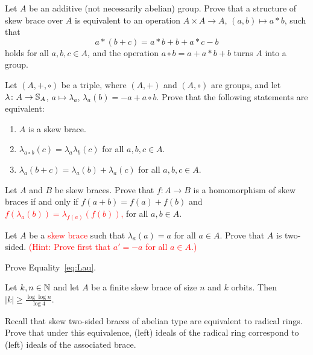 \begin{prob}
\label{prob:star}
Let $A$ be an additive (not necessarily abelian) group.  
Prove that a structure of skew brace over $A$ is equivalent to an operation $A\times A\to
A$, $(a,b)\mapsto a*b$, such that 
\[
a*(b+c)=a*b+b+a*c-b
\]
holds for all $a,b,c\in A$, and the operation $a\circ b=a+a*b+b$ turns $A$
into a group. 
\end{prob}

\begin{prob}
\label{prob:equivalences}
	Let $(A,+,\circ)$ be a triple, where 
	$(A,+)$ and $(A,\circ)$ are
	groups, and let $\lambda\colon A\to\mathbb{S}_A$, $a\mapsto\lambda_a$, $\lambda_a(b)=-a+a\circ b$. 
	Prove that the following statements are equivalent:
	\begin{enumerate}
		\item $A$ is a skew brace.
		\item $\lambda_{a\circ b}(c)=\lambda_a\lambda_b(c)$ for all $a,b,c\in A$.
		\item $\lambda_a(b+c)=\lambda_a(b)+\lambda_a(c)$ for all $a,b,c\in A$.
	\end{enumerate}
\end{prob}

\begin{prob}
Let $A$ and $B$ be skew braces. Prove that $f\colon A\rightarrow B$ is a homomorphism of skew braces if and only if $f(a+b)=f(a)+f(b)$ and \textcolor{red}{$f(\lambda_a(b))=\lambda_{f(a)}(f(b))$,} for all $a,b\in A$.
\end{prob}


\begin{prob}
\label{prob:2sided}
	Let $A$ be a \textcolor{red}{skew brace} such that $\lambda_a(a)=a$ for all $a\in A$.
	Prove that $A$ is two-sided. \textcolor{red}{(Hint: Prove first that $a'=-a$ for all $a\in A$.)}
\end{prob}

\begin{prob}
\label{prob:Lau}
    Prove Equality~\eqref{eq:Lau}.
\end{prob}

\begin{prob}
\label{prob:Landau}
Let $k,n\in\mathbb{N}$ and let $A$ be a finite skew brace of size $n$ and $k$ orbits. 
Then $|k|\geq\frac{\log\log n}{\log 4}$. 
\end{prob}


\begin{prob}
\label{prob:radical}
Recall that skew two-sided braces of abelian type are equivalent to radical rings. Prove that under this equivalence, 
(left) ideals of the radical ring correspond to (left) ideals of the associated brace. 
\end{prob}

